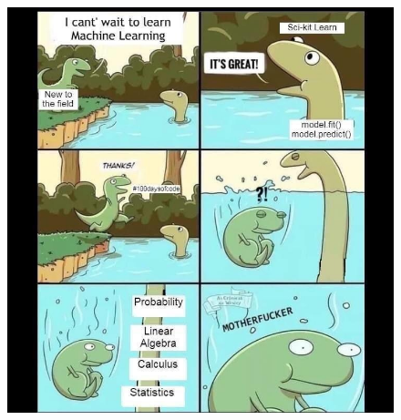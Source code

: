 \documentclass[
  shownotes,
  xcolor={svgnames},
  hyperref={colorlinks,citecolor=DarkBlue,linkcolor=DarkRed,urlcolor=DarkBlue}
  , aspectratio=169]{beamer}
\begin{document}
\begin{frame}
\begin{minipage}[t]{0.58\linewidth}
\begin{itemize}
        \end{itemize}
    \end{minipage}
    \hfill
    \begin{minipage}[t]{0.38\linewidth}%
        \begin{figure}[H] \centering
            \captionsetup{justification=centering}  
            \includegraphics[scale=0.2]{figures/ml_trick}
    \end{figure}
    \end{minipage}

\end{frame}

\end{document}
